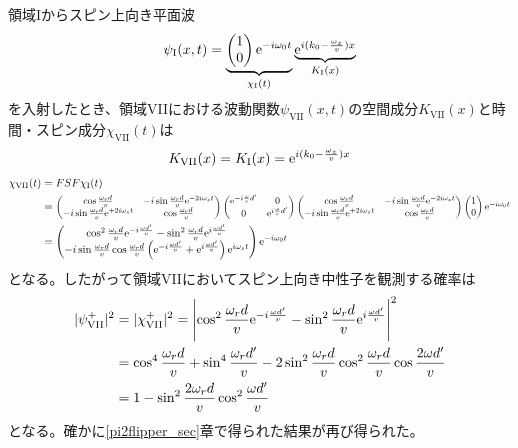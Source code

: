領域Iからスピン上向き平面波
\begin{equation}
\psi_\mathrm{I}(x,t)=\underbrace{\begin{pmatrix} 1\\0\end{pmatrix} \mathrm{e}^{-i\omega_0t}}_{\chi_\mathrm{I}(t)} \underbrace{\mathrm{e}^{i (k_0-\frac{\omega_z}{v})x}}_{K_\mathrm{I}(x)}
\end{equation}
を入射したとき、領域VIIにおける波動関数$\psi_\mathrm{VII}(x,t)$の空間成分$K_\mathrm{VII}(x)$と時間・スピン成分$\chi_\mathrm{VII}(t)$は
\begin{align}
K_\mathrm{VII}(x)=K_\mathrm{I}(x)=\mathrm{e}^{i (k_0-\frac{\omega_z}{v})x}
\end{align}
\begin{align}
\chi_\mathrm{VII}(t)&=FSF\chi_\mathrm{I}(t) \notag \\
&=\scalebox{0.9}{$\begin{pmatrix} \cos \frac{\omega_r d}{v} &-i\sin\frac{\omega_rd}{v}\e^{-2i\omega_zt} \\ -i\sin\frac{\omega_rd}{v}\e^{+2i\omega_zt} &\cos \frac{\omega_r d}{v}\end{pmatrix}\begin{pmatrix} \e^{-i\frac{\omega}{v}d'} & 0\\0 &\e^{i\frac{\omega}{v}d'} \end{pmatrix}\begin{pmatrix} \cos \frac{\omega_r d}{v} &-i\sin\frac{\omega_rd}{v}\e^{-2i\omega_zt} \\ -i\sin\frac{\omega_rd}{v}\e^{+2i\omega_zt} &\cos \frac{\omega_r d}{v}\end{pmatrix} \begin{pmatrix} 1\\0\end{pmatrix} \e^{-i\omega_0t}$} \notag \\
&=\begin{pmatrix} \cos^2 \frac{\omega_r d}{v} \e^{-i\frac{\omega d'}{v}} -\sin^2 \frac{\omega_r d}{v} \e^{i\frac{\omega d'}{v}} \\ -i\sin\frac{\omega_r d}{v}\cos\frac{\omega_r d}{v}\left(\e^{-i\frac{\omega d'}{v}}+\e^{i\frac{\omega d'}{v}} \right) \e^{i\omega_s t} \end{pmatrix}\e^{-i\omega_0t}
\end{align}
となる。したがって領域VIIにおいてスピン上向き中性子を観測する確率は
\begin{align}
|\psi_\mathrm{VII}^+|^2&=|\chi_\mathrm{VII}^+|^2=\Biggl|\cos^2 \frac{\omega_r d}{v} \mathrm{e}^{-i\frac{\omega d'}{v}} -\sin^2 \frac{\omega_r d}{v} \mathrm{e}^{i\frac{\omega d'}{v}}\Biggr|^2\notag \\
&=\cos^4 \frac{\omega_r d}{v} +\sin^4 \frac{\omega_r d'}{v} -2\sin^2\frac{\omega_rd}{v}\cos^2\frac{\omega_rd}{v} \cos \frac{2\omega d'}{v} \notag \\
&=1-\sin^2 \frac{2\omega_r d}{v} \cos^2 \frac{\omega d'}{v}
\end{align}
となる。確かに\ref{pi2flipper_sec}章で得られた結果が再び得られた。
\renewcommand{\arraystretch}{1}





